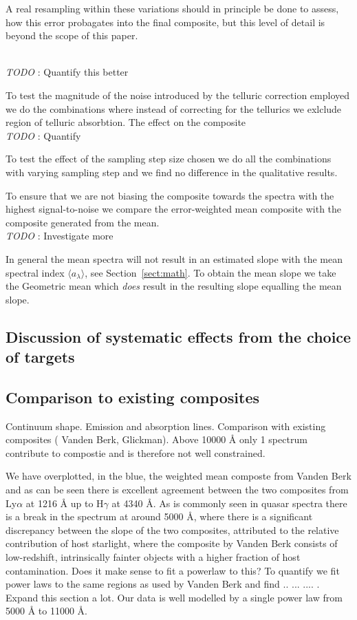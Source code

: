 \documentclass{aa}    %
\newcommand{\sectionname}{Section}
\newcommand{\Sect}[1]{\sectionname~\ref{sect:#1}}
\newcommand{\sect}[1]{\Sect{#1}}
\newcommand{\sectlabel}[1]{\label{sect:#1}}
\newcommand{\todo}[3]{{\color{#2}\emph{#1}: #3}}
\newcommand{\jstodo}[1]{\todo{ \\TODO }{red}{#1}}
\begin{document}
 

A real resampling within these variations should in principle be done to assess, how this error probagates into the final composite, but this level of detail is beyond the scope of this paper. 

\jstodo{Quantify this better}

To test the magnitude of the noise introduced by the telluric correction employed we do the combinations where instead of correcting for the tellurics we exlclude region of telluric absorbtion. The effect on the composite  
\jstodo{Quantify}

To test the effect of the sampling step size chosen we do all the combinations with varying sampling step and we find no difference in the qualitative results. 




 To ensure that we are not biasing the composite towards the spectra with the highest signal-to-noise we compare the error-weighted mean composite with the composite generated from the mean.
 \jstodo{Investigate more}
 
  
In general the mean spectra will not result in an estimated slope with the mean spectral index $\langle a_\lambda\rangle$, see \sect{math}. To obtain the mean slope we take the Geometric mean which \textit{does} result in the resulting slope equalling the mean slope. 




\subsection{Discussion of systematic effects from the choice of targets}





\subsection{Comparison to existing composites} \sectlabel{comparison}
Continuum shape. Emission and absorption lines. Comparison with existing composites ( Vanden Berk, Glickman). Above 10000 \r{A} only 1 spectrum contribute to compostie and is therefore not well constrained. 


 We have overplotted, in the blue, the weighted mean composte from Vanden Berk and as can be seen there is excellent agreement between the two composites from Ly$\alpha$ at 1216 \r{A} up to H$\gamma$ at 4340 \r{A}. As is commonly seen in quasar spectra there is a break in the spectrum at around 5000 \r{A}, where there is a significant discrepancy between the slope of the two composites, attributed to the relative contribution of host starlight, where the composite by Vanden Berk consists of low-redshift, intrinsically fainter objects with a higher fraction of host contamination. Does it make sense to fit a powerlaw to this? To quantify we fit power laws to the same regions as used by Vanden Berk and find .. ... .... . Expand this section a lot. Our data is well modelled by a single power law from 5000 \r{A} to 11000 \r{A}. 
 
\end{document}
